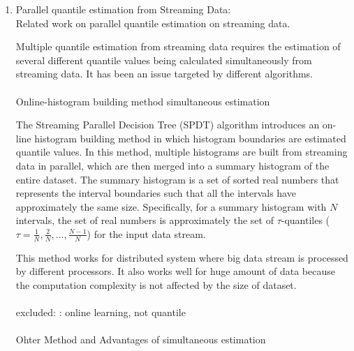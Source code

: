 \documentclass[12pt]{article}
\begin{document}
\begin{enumerate}
    \pagebreak    
    \item Parallel quantile estimation from Streaming Data: \\
        Related work on parallel quantile estimation on streaming data.



        Multiple quantile estimation from streaming data requires the estimation of several different quantile values being calculated simultaneously from streaming data. It has been an issue targeted by different algorithms.\\\\

        Online-histogram building method simultaneous estimation\cite{ben-haimStreamingParallelDecision} 

        The Streaming Parallel Decision Tree (SPDT) algorithm \cite{ben-haimStreamingParallelDecision} introduces an on-line histogram building method %
        in which histogram boundaries are estimated quantile values.
        In this method, multiple histograms are built from streaming data in parallel, which are then merged into a summary histogram of the entire dataset. The summary histogram is a set of sorted real numbers that represents the interval boundaries such that all the intervals have approximately the same size. Specifically, for a summary histogram with $N$ intervals, the set of real numbers is approximately the set of $\tau$-quantiles ($\tau = \frac{1}{N}, \frac{2}{N}, ..., \frac{N-1}{N}$) for the input data stream.

        This method works for distributed system where big data stream is processed by different processors. It also works well for huge amount of data because the computation complexity is not affected by the size of dataset.
        \\\\
        excluded: \cite{pebayFormulasRobustOnepass2008}: online learning, not quantile\\\\


        Ohter Method and Advantages of simultaneous estimation\cite{mcdermottDataSkeletonsSimultaneous2007}


\end{enumerate}
\end{document}
